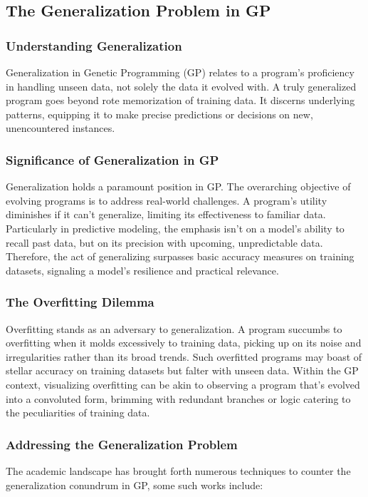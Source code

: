 \subsection{The Generalization Problem in GP}
\label{sec:bg:gp:generalization}

  \subsubsection{Understanding Generalization}
    Generalization in Genetic Programming (GP) relates to a program's 
    proficiency in handling unseen data, not solely the data it evolved with. A 
    truly generalized program goes beyond rote memorization of training data. It 
    discerns underlying patterns, equipping it to make precise predictions or 
    decisions on new, unencountered instances.

  \subsubsection{Significance of Generalization in GP}
    Generalization holds a paramount position in GP. The overarching objective 
    of evolving programs is to address real-world challenges. A program's 
    utility diminishes if it can't generalize, limiting its effectiveness to 
    familiar data. Particularly in predictive modeling, the emphasis isn't on a 
    model's ability to recall past data, but on its precision with upcoming, 
    unpredictable data. Therefore, the act of generalizing surpasses basic 
    accuracy measures on training datasets, signaling a model's resilience and 
    practical relevance.

  \subsubsection{The Overfitting Dilemma}
    Overfitting stands as an adversary to generalization. A program succumbs to 
    overfitting when it molds excessively to training data, picking up on its 
    noise and irregularities rather than its broad trends. Such overfitted 
    programs may boast of stellar accuracy on training datasets but falter with 
    unseen data. Within the GP context, visualizing overfitting can be akin to 
    observing a program that's evolved into a convoluted form, brimming with 
    redundant branches or logic catering to the peculiarities of training data.

  \subsubsection{Addressing the Generalization Problem}
    The academic landscape has brought forth numerous techniques to counter the 
    generalization conundrum in GP, some such works include:

